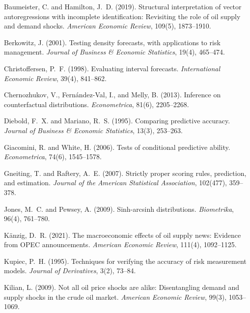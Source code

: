\documentclass[11pt]{article}
\begin{document}

\begin{thebibliography}{}
Baumeister, C. and Hamilton, J.~D. (2019). Structural interpretation of vector autoregressions with incomplete identification: Revisiting the role of oil supply and demand shocks. \emph{American Economic Review}, 109(5), 1873--1910.

Berkowitz, J. (2001). Testing density forecasts, with applications to risk management. \emph{Journal of Business \& Economic Statistics}, 19(4), 465--474.

Christoffersen, P.~F. (1998). Evaluating interval forecasts. \emph{International Economic Review}, 39(4), 841--862.

Chernozhukov, V., Fern{\'a}ndez-Val, I., and Melly, B. (2013). Inference on counterfactual distributions. \emph{Econometrica}, 81(6), 2205--2268.

Diebold, F.~X. and Mariano, R.~S. (1995). Comparing predictive accuracy. \emph{Journal of Business \& Economic Statistics}, 13(3), 253--263.

Giacomini, R. and White, H. (2006). Tests of conditional predictive ability. \emph{Econometrica}, 74(6), 1545--1578.

Gneiting, T. and Raftery, A.~E. (2007). Strictly proper scoring rules, prediction, and estimation. \emph{Journal of the American Statistical Association}, 102(477), 359--378.

Jones, M.~C. and Pewsey, A. (2009). Sinh-arcsinh distributions. \emph{Biometrika}, 96(4), 761--780.

K{\"a}nzig, D.~R. (2021). The macroeconomic effects of oil supply news: Evidence from OPEC announcements. \emph{American Economic Review}, 111(4), 1092--1125.

Kupiec, P.~H. (1995). Techniques for verifying the accuracy of risk measurement models. \emph{Journal of Derivatives}, 3(2), 73--84.

Kilian, L. (2009). Not all oil price shocks are alike: Disentangling demand and supply shocks in the crude oil market. \emph{American Economic Review}, 99(3), 1053--1069.
\end{thebibliography}
\end{document}
